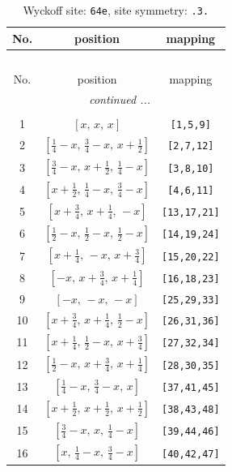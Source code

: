 \documentclass[fleqn,8pt]{jsarticle}
\begin{document}
\begin{longtable}{ccc}
\caption{Wyckoff site: {\tt 64e}, site symmetry: {\tt .3.}}
 \\
 \hline \hline
No. & position & mapping \\ \hline \endfirsthead

\multicolumn{2}{l}{\tablename\ \thetable{}} \\
 \hline \hline
No. & position & mapping \\ \hline \endhead

 \hline \hline
\multicolumn{2}{r}{\footnotesize\it continued ...} \\ \endfoot

 \hline \hline
\multicolumn{2}{r}{} \\ \endlastfoot

1 & $\left[ x,\, x,\, x \right]$ & {\tt [1,5,9]} \\ \hline
2 & $\left[ \frac{1}{4} - x,\, \frac{3}{4} - x,\, x + \frac{1}{2} \right]$ & {\tt [2,7,12]} \\ \hline
3 & $\left[ \frac{3}{4} - x,\, x + \frac{1}{2},\, \frac{1}{4} - x \right]$ & {\tt [3,8,10]} \\ \hline
4 & $\left[ x + \frac{1}{2},\, \frac{1}{4} - x,\, \frac{3}{4} - x \right]$ & {\tt [4,6,11]} \\ \hline
5 & $\left[ x + \frac{3}{4},\, x + \frac{1}{4},\, - x \right]$ & {\tt [13,17,21]} \\ \hline
6 & $\left[ \frac{1}{2} - x,\, \frac{1}{2} - x,\, \frac{1}{2} - x \right]$ & {\tt [14,19,24]} \\ \hline
7 & $\left[ x + \frac{1}{4},\, - x,\, x + \frac{3}{4} \right]$ & {\tt [15,20,22]} \\ \hline
8 & $\left[ - x,\, x + \frac{3}{4},\, x + \frac{1}{4} \right]$ & {\tt [16,18,23]} \\ \hline
9 & $\left[ - x,\, - x,\, - x \right]$ & {\tt [25,29,33]} \\ \hline
10 & $\left[ x + \frac{3}{4},\, x + \frac{1}{4},\, \frac{1}{2} - x \right]$ & {\tt [26,31,36]} \\ \hline
11 & $\left[ x + \frac{1}{4},\, \frac{1}{2} - x,\, x + \frac{3}{4} \right]$ & {\tt [27,32,34]} \\ \hline
12 & $\left[ \frac{1}{2} - x,\, x + \frac{3}{4},\, x + \frac{1}{4} \right]$ & {\tt [28,30,35]} \\ \hline
13 & $\left[ \frac{1}{4} - x,\, \frac{3}{4} - x,\, x \right]$ & {\tt [37,41,45]} \\ \hline
14 & $\left[ x + \frac{1}{2},\, x + \frac{1}{2},\, x + \frac{1}{2} \right]$ & {\tt [38,43,48]} \\ \hline
15 & $\left[ \frac{3}{4} - x,\, x,\, \frac{1}{4} - x \right]$ & {\tt [39,44,46]} \\ \hline
16 & $\left[ x,\, \frac{1}{4} - x,\, \frac{3}{4} - x \right]$ & {\tt [40,42,47]} \\
\end{longtable}
\end{document}
